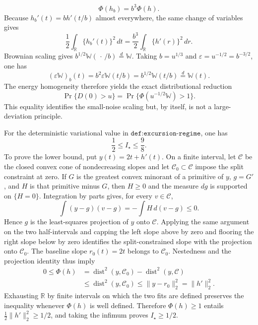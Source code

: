 \[
 \Phi(h_b)=b^3\Phi(h).
\]
Because \(h_b'(t)=b h'(t/b)\) almost everywhere, the same change of variables gives
\[
 \frac12\int_{\mathbb R}\{h_b'(t)\}^2\,dt
 =\frac{b^3}{2}\int_{\mathbb R}\{h'(r)\}^2\,dr.
\]
Brownian scaling gives \(b^{1/2}\mathbb W(\,\cdot\,/b)\stackrel{d}=\mathbb W\).  Taking \(b=u^{1/3}\) and \(\varepsilon=u^{-1/2}=b^{-3/2}\), one has
\[
 (\varepsilon\mathbb W)_b(t)=b^2\varepsilon\mathbb W(t/b)
 =b^{1/2}\mathbb W(t/b)\stackrel{d}=\mathbb W(t).
\]
The energy homogeneity therefore yields the exact distributional reduction
\[
 \Pr\{D(0)>u\}
 =\Pr\{\Phi(u^{-1/2}\mathbb W)>1\}.
\]
This equality identifies the small-noise scaling but, by itself, is not a large-deviation principle.

For the deterministic variational value in \(\texttt{def:excursion-regime}\), one has
\[
 \frac12\le I_\star\le\frac98.
\]
To prove the lower bound, put \(y(t)=2t+h'(t)\).  On a finite interval, let \(\mathcal C\) be the closed convex cone of nondecreasing slopes and let \(\mathcal C_0\subset\mathcal C\) impose the split constraint at zero.  If \(G\) is the greatest convex minorant of a primitive of \(y\), \(g=G'\), and \(H\) is that primitive minus \(G\), then \(H\ge0\) and the measure \(dg\) is supported on \(\{H=0\}\).  Integration by parts gives, for every \(v\in\mathcal C\),
\[
 \int (y-g)(v-g)
 =-\int H\,d(v-g)\le0.
\]
Hence \(g\) is the least-squares projection of \(y\) onto \(\mathcal C\).  Applying the same argument on the two half-intervals and capping the left slope above by zero and flooring the right slope below by zero identifies the split-constrained slope with the projection onto \(\mathcal C_0\).  The baseline slope \(r_0(t)=2t\) belongs to \(\mathcal C_0\).  Nestedness and the projection identity thus imply
\[
 \begin{aligned}
 0\le\Phi(h)
 &=\operatorname{dist}^2(y,\mathcal C_0)
   -\operatorname{dist}^2(y,\mathcal C)\\
 &\le \operatorname{dist}^2(y,\mathcal C_0)
 \le \lVert y-r_0\rVert_2^2
 =\lVert h'\rVert_2^2.
 \end{aligned}
\]
Exhausting \(\mathbb R\) by finite intervals on which the two fits are defined preserves the inequality whenever \(\Phi(h)\) is well defined.  Therefore \(\Phi(h)\ge1\) entails \(\frac12\lVert h'\rVert_2^2\ge1/2\), and taking the infimum proves \(I_\star\ge1/2\).

